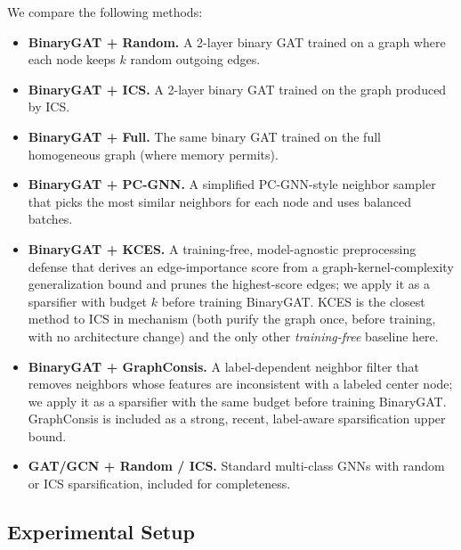 \documentclass[11pt]{article}
\begin{document}
We compare the following methods:
\begin{itemize}
    \item \textbf{BinaryGAT + Random.} A 2-layer binary GAT trained on a graph where each node keeps $k$ random outgoing edges.
    \item \textbf{BinaryGAT + ICS.} A 2-layer binary GAT trained on the graph produced by ICS.
    \item \textbf{BinaryGAT + Full.} The same binary GAT trained on the full homogeneous graph (where memory permits).
    \item \textbf{BinaryGAT + PC-GNN.} A simplified PC-GNN-style neighbor sampler \cite{liu2021pcgnn} that picks the most similar neighbors for each node and uses balanced batches.
    \item \textbf{BinaryGAT + KCES.} A training-free, model-agnostic preprocessing defense \cite{jia2026kces} that derives an edge-importance score from a graph-kernel-complexity generalization bound and prunes the highest-score edges; we apply it as a sparsifier with budget $k$ before training BinaryGAT. KCES is the closest method to ICS in mechanism (both purify the graph once, before training, with no architecture change) and the only other \emph{training-free} baseline here.
    \item \textbf{BinaryGAT + GraphConsis.} A label-dependent neighbor filter \cite{liu2020graphconsis} that removes neighbors whose features are inconsistent with a labeled center node; we apply it as a sparsifier with the same budget before training BinaryGAT. GraphConsis is included as a strong, recent, label-aware sparsification upper bound.
    \item \textbf{GAT/GCN + Random / ICS.} Standard multi-class GNNs with random or ICS sparsification, included for completeness.
\end{itemize}

\subsection{Experimental Setup}
\end{document}
